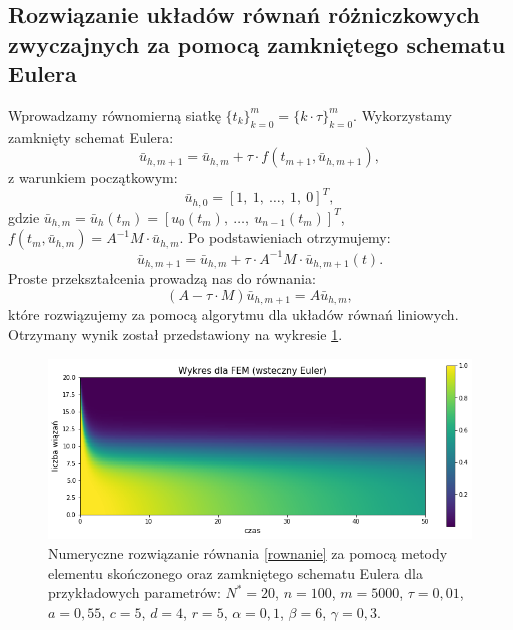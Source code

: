 \documentclass{article}
\begin{document}
\subsection{Rozwiązanie układów równań różniczkowych zwyczajnych za pomocą zamkniętego schematu Eulera} 
Wprowadzamy równomierną siatkę $\{t_k\}_{k=0}^{m} = \{k\cdot\tau\}_{k=0}^{m}$. Wykorzystamy zamknięty schemat Eulera:
\begin{equation*}
\bar{u}_{h,m+1} = \bar{u}_{h,m} + \tau \cdot f(t_{m+1}, \bar{u}_{h,m+1}),
\end{equation*}
z warunkiem początkowym:
\begin{equation*}
\bar{u}_{h,0} = [1, \ 1, \ \dots, \ 1, \ 0]^{T},
\end{equation*}
gdzie $\bar{u}_{h,m} = \bar{u}_{h}(t_m) = [u_{0}(t_{m}),  \ \dots , \ u_{n-1}(t_{m}) ]^{T}$, $f(t_{m}, \bar{u}_{h,m}) = A^{-1} M \cdot \bar{u}_{h,m}$. Po podstawieniach otrzymujemy:
\begin{equation*}
\bar{u}_{h,m+1} = \bar{u}_{h,m} + \tau \cdot A^{-1} M \cdot \bar{u}_{h,m+1}(t).
\end{equation*}
Proste przekształcenia prowadzą nas do równania:
\begin{equation*}
(A - \tau \cdot M)\bar{u}_{h,m+1} = A \bar{u}_{h,m},
\end{equation*}
które rozwiązujemy za pomocą algorytmu dla układów równań liniowych. Otrzymany wynik został przedstawiony na wykresie \ref{mes euler}.
\begin{figure}[h!]
	\centering
	\includegraphics[width=\textwidth]{images/wykres_fem_euler.pdf}
	\caption{Numeryczne rozwiązanie równania \eqref{rownanie} za pomocą metody elementu skończonego oraz zamkniętego schematu Eulera dla przykładowych parametrów: $N^{*}=20$, $n=100$, $m=5000$, $\tau=0,01$, $a=0,55$, $c=5$, $d=4$, $r=5$, $\alpha=0,1$, $\beta=6$, $\gamma=0,3$. }\label{mes euler}
\end{figure}

\end{document}
